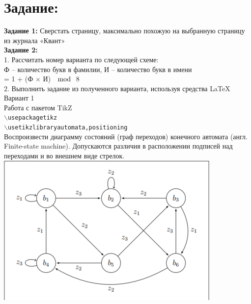 \section{Задание:}
\textbf{Задание 1:} Сверстать страницу, максимально похожую на выбранную страницу из журнала «Квант»\\
\textbf{Задание 2:}\\
1. Рассчитать номер варианта по следующей схеме:\\
Ф – количество букв в фамилии, И – количество букв в имени\\
 = 1 + (Ф $\times$ И) $\mod$ 8\\
2. Выполнить задание из полученного варианта, используя средства \LaTeX\\
Вариант 1\\
Работа с пакетом TikZ\\
\texttt{$\backslash$usepackage{tikz}}\\
\texttt{$\backslash$usetikzlibrary{automata,positioning}}\\
Воспроизвести диаграмму состояний (граф переходов) конечного автомата (англ.\\
Finite-state machine). Допускаются различия в расположении подписей над\\
переходами и во внешнем виде стрелок.\\
\includegraphics[width=\linewidth]{task2.png}\\
